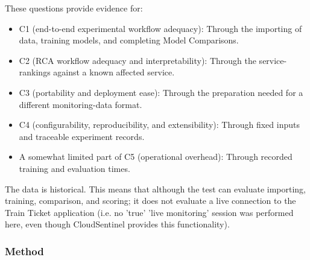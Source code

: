 These questions provide evidence for:
\begin{itemize}
    \item C1 (end-to-end experimental workflow adequacy): Through the importing of data, training models, and completing Model Comparisons.
    \item C2 (RCA workflow adequacy and interpretability): Through the service-rankings against a known affected service.
    \item C3 (portability and deployment ease): Through the preparation needed for a different monitoring-data format.
    \item C4 (configurability, reproducibility, and extensibility): Through fixed inputs and traceable experiment records.
    \item A somewhat limited part of C5 (operational overhead): Through recorded training and evaluation times.
\end{itemize}
The data is historical. This means that although the test can evaluate importing, training, comparison, and scoring; it does not evaluate a live connection to the Train Ticket application (i.e. no 'true' 'live monitoring' session was performed here, even though CloudSentinel provides this functionality).

\subsubsection{Method}



